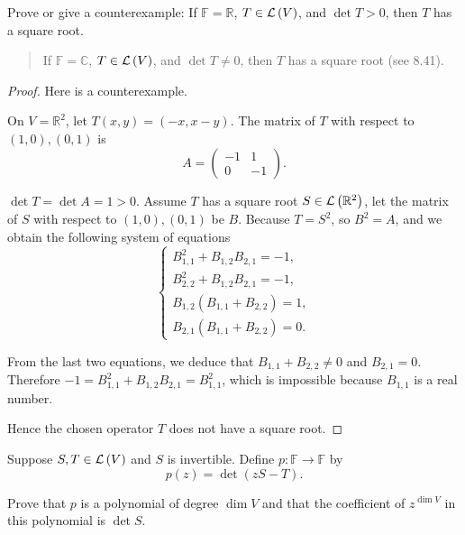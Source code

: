 \begin{exercise}\label{chapter9:sectionC:exercise11}
    Prove or give a counterexample: If $\mathbb{F} = \mathbb{R}$, $T\in\mathcal{L}\left({V}\right)$, and $\det T > 0$, then $T$ has a square root.
\end{exercise}

\begin{quote}
    If $\mathbb{F} = \mathbb{C}$, $T\in\mathcal{L}\left({V}\right)$, and $\det T\ne 0$, then $T$ has a square root (see 8.41).
\end{quote}

\begin{proof}
    Here is a counterexample.

    On $V = \mathbb{R}^{2}$, let $T(x, y) = (-x, x - y)$. The matrix of $T$ with respect to $(1, 0), (0, 1)$ is
    \[
        A = \begin{pmatrix}
            -1 & 1  \\
            0  & -1
        \end{pmatrix}.
    \]

    $\det T = \det A = 1 > 0$. Assume $T$ has a square root $S\in\mathcal{L}\left({\mathbb{R}^{2}}\right)$, let the matrix of $S$ with respect to $(1, 0), (0, 1)$ be $B$. Because $T = S^{2}$, so $B^{2} = A$, and we obtain the following system of equations
    \[
        \begin{cases}
            B_{1,1}^{2} + B_{1,2}B_{2,1} = -1, \\
            B_{2,2}^{2} + B_{1,2}B_{2,1} = -1, \\
            B_{1,2}(B_{1,1} + B_{2,2}) = 1,    \\
            B_{2,1}(B_{1,1} + B_{2,2}) = 0.
        \end{cases}
    \]

    From the last two equations, we deduce that $B_{1,1} + B_{2,2}\ne 0$ and $B_{2,1} = 0$. Therefore $-1 = B_{1,1}^{2} + B_{1,2}B_{2,1} = B_{1,1}^{2}$, which is impossible because $B_{1,1}$ is a real number.

    Hence the chosen operator $T$ does not have a square root.
\end{proof}
\newpage

\begin{exercise}\label{chapter9:sectionC:exercise12}
    Suppose $S, T\in\mathcal{L}\left({V}\right)$ and $S$ is invertible. Define $p: \mathbb{F}\to\mathbb{F}$ by
    \[
        p(z) = \det(zS - T).
    \]

    Prove that $p$ is a polynomial of degree $\dim V$ and that the coefficient of $z^{\dim V}$ in this polynomial is $\det S$.
\end{exercise}

